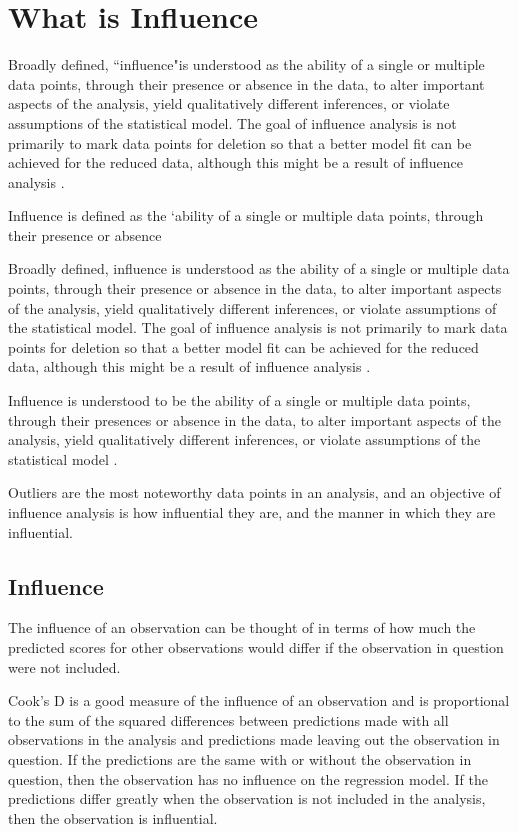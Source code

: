 \documentclass[12pt, a4paper]{article}
\begin{document}
	

\section{What is Influence} %

Broadly defined, ``influence"is understood as the ability of a single or multiple data points, through their presence
or absence in the data, to alter important aspects of the analysis, yield qualitatively different inferences, or
violate assumptions of the statistical model. The goal of influence analysis is not primarily to mark data
points for deletion so that a better model fit can be achieved for the reduced data, although this might be a
result of influence analysis \citep{schabenberger}.

Influence is defined as the `ability of a single or multiple data points, through their presence or absence
	
	Broadly defined, influence is understood as the ability of a single or multiple data points, through their presence or absence in the data, to alter important aspects of the analysis, yield qualitatively different inferences, or violate assumptions of the statistical model. The goal of influence analysis is not primarily to mark data
	points for deletion so that a better model fit can be achieved for the reduced data, although this might be a result of influence analysis \citep{schabenberger}.
	
Influence is understood to be the ability of a single or multiple data points, through their presences or absence in the data, to
alter important aspects of the analysis, yield qualitatively different inferences, or violate assumptions of the statistical
model \citep{schabenberger}.

Outliers are the most noteworthy data points in an analysis, and
an objective of influence analysis is how influential they are,
and the manner in which they are influential.

			
			\subsection{Influence}
			The influence of an observation can be thought of in terms of how much the predicted scores for other observations would differ if the observation in question were not included. 
			
			Cook's D is a good measure of the influence of an observation and is proportional to the sum of the squared differences between predictions made with all observations in the analysis and predictions made leaving out the observation in question. If the predictions are the same with or without the observation in question, then the observation has no influence on the regression model. If the predictions differ greatly when the observation is not included in the analysis, then the observation is influential.
			
\end{document}
